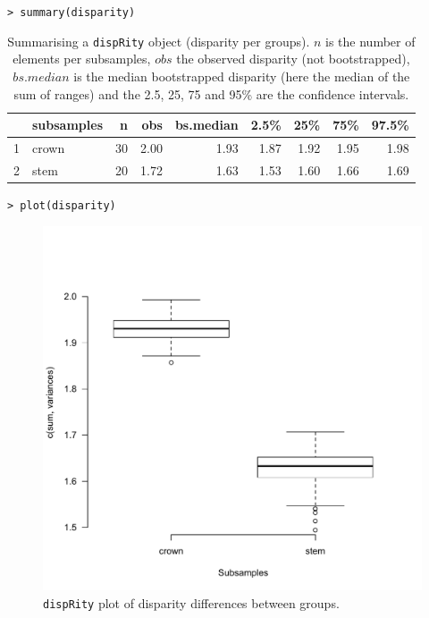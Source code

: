 \documentclass[12pt,letterpaper]{article}
\newcommand{\disp}{\texttt{dispRity} }
\begin{document}
\noindent \texttt{> summary(disparity)}

\begin{table}[ht]
\centering
\begin{tabular}{rlrrrrrrr}
  \hline
 & subsamples & n & obs & bs.median & 2.5\% & 25\% & 75\% & 97.5\% \\ 
  \hline
1 & crown &  30 & 2.00 & 1.93 & 1.87 & 1.92 & 1.95 & 1.98 \\ 
  2 & stem &  20 & 1.72 & 1.63 & 1.53 & 1.60 & 1.66 & 1.69 \\ 
   \hline
\end{tabular}
\caption{Summarising a \disp object (disparity per groups). $n$ is the number of elements per subsamples, $obs$ the observed disparity (not bootstrapped), $bs.median$ is the median bootstrapped disparity (here the median of the sum of ranges) and the 2.5, 25, 75 and 95\% are the confidence intervals.}
\label{Tab:summary_group}
\end{table}

\noindent \texttt{> plot(disparity)}

\begin{figure}[!htbp]
\centering
   \includegraphics[width=1\textwidth]{plot_example_group.pdf} 
\caption{\disp plot of disparity differences between groups.}
\label{Fig:plot_group}
\end{figure}
\end{document}
